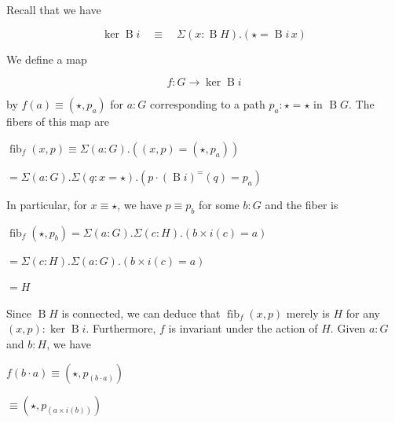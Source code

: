  
Recall that we have\par
  
\par  \quad  \[\ker\operatorname{B}i\quad\equiv\quad\Sigma(x:\operatorname{B}H).(\star=\operatorname{B}i\,x)\]\quad  \quad  
  
We define a map\par
  
\par  \quad  \[f:G\to\ker\operatorname{B}i\]\quad  \quad  
  
by $f(a)\equiv(\star,p_{a})$ for $a:G$ corresponding to a path $p_{a}:\star=\star$ in $\operatorname{B}G$. The fibers of this map are\par
  
\par  \quad  $\displaystyle\operatorname{fib}_{f}(x,p)$\quad  $\displaystyle\equiv\Sigma(a:G).((x,p)=(\star,p_{a}))$\quad  \quad  
 
\par  \quad  \quad  $\displaystyle=\Sigma(a:G).\Sigma(q:x=\star).(p\cdot(\operatorname{B}i)^{=}(q)=p_{a})$\quad  \quad  
  
In particular, for $x\equiv\star$, we have $p\equiv p_{b}$ for some $b:G$ and the fiber is\par
  
\par  \quad  $\displaystyle\operatorname{fib}_{f}(\star,p_{b})$\quad  $\displaystyle=\Sigma(a:G).\Sigma(c:H).(b\times i(c)=a)$\quad  \quad  
 
\par  \quad  \quad  $\displaystyle=\Sigma(c:H).\Sigma(a:G).(b\times i(c)=a)$\quad  \quad  
 
\par  \quad  \quad  $\displaystyle=H$\quad  \quad  
  
Since $\operatorname{B}H$ is connected, we can deduce that $\operatorname{fib}_{f}(x,p)$ merely is $H$ for any $(x,p):\ker\operatorname{B}i$. Furthermore, $f$ is invariant under the action of $H$. Given $a:G$ and $b:H$, we have\par
  
\par  \quad  $\displaystyle f(b\cdot a)$\quad  $\displaystyle\equiv(\star,p_{(b\cdot a)})$\quad  \quad  
 
\par  \quad  \quad  $\displaystyle\equiv(\star,p_{(a\times i(b))})$\quad  \quad  
 
